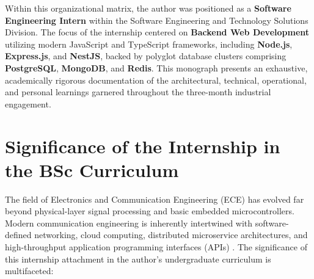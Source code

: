 Within this organizational matrix, the author was positioned as a \textbf{Software Engineering Intern} within the Software Engineering and Technology Solutions Division. The focus of the internship centered on \textbf{Backend Web Development} utilizing modern JavaScript and TypeScript frameworks, including \textbf{Node.js}, \textbf{Express.js}, and \textbf{NestJS}, backed by polyglot database clusters comprising \textbf{PostgreSQL}, \textbf{MongoDB}, and \textbf{Redis}. This monograph presents an exhaustive, academically rigorous documentation of the architectural, technical, operational, and personal learnings garnered throughout the three-month industrial engagement.

\section{Significance of the Internship in the BSc Curriculum}
\label{sec:intro_significance}

The field of Electronics and Communication Engineering (ECE) has evolved far beyond physical-layer signal processing and basic embedded microcontrollers. Modern communication engineering is inherently intertwined with software-defined networking, cloud computing, distributed microservice architectures, and high-throughput application programming interfaces (APIs) \citep{kurose2017computer}. The significance of this internship attachment in the author's undergraduate curriculum is multifaceted:

